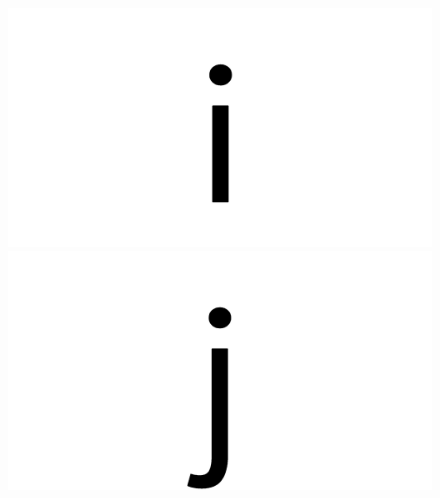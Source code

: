 \documentclass{article}
\begin{document}
\begin{figure}[H]
  \includegraphics[width=\linewidth]{i}
\endminipage\hfill
{}
  \includegraphics[width=\linewidth]{j}
\endminipage\hfill
\end{figure}

\clearpage
\end{document}
